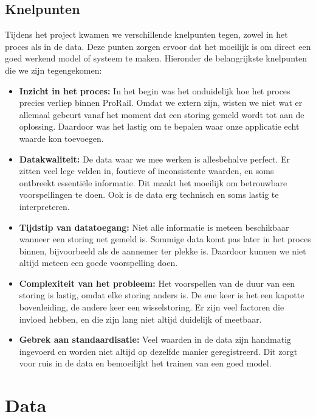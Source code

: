 \documentclass{article}
\begin{document}
\subsection{Knelpunten}
Tijdens het project kwamen we verschillende knelpunten tegen, zowel in het proces als in de data. Deze punten zorgen ervoor dat het moeilijk is om direct een goed werkend model of systeem te maken. Hieronder de belangrijkste knelpunten die we zijn tegengekomen:

\begin{itemize}
    \item \textbf{Inzicht in het proces:} In het begin was het onduidelijk hoe het proces precies verliep binnen ProRail. Omdat we extern zijn, wisten we niet wat er allemaal gebeurt vanaf het moment dat een storing gemeld wordt tot aan de oplossing. Daardoor was het lastig om te bepalen waar onze applicatie echt waarde kon toevoegen.

    \item \textbf{Datakwaliteit:} De data waar we mee werken is allesbehalve perfect. Er zitten veel lege velden in, foutieve of inconsistente waarden, en soms ontbreekt essentiële informatie. Dit maakt het moeilijk om betrouwbare voorspellingen te doen. Ook is de data erg technisch en soms lastig te interpreteren.

    \item \textbf{Tijdstip van datatoegang:} Niet alle informatie is meteen beschikbaar wanneer een storing net gemeld is. Sommige data komt pas later in het proces binnen, bijvoorbeeld als de aannemer ter plekke is. Daardoor kunnen we niet altijd meteen een goede voorspelling doen.

    \item \textbf{Complexiteit van het probleem:} Het voorspellen van de duur van een storing is lastig, omdat elke storing anders is. De ene keer is het een kapotte bovenleiding, de andere keer een wisselstoring. Er zijn veel factoren die invloed hebben, en die zijn lang niet altijd duidelijk of meetbaar.

    \item \textbf{Gebrek aan standaardisatie:} Veel waarden in de data zijn handmatig ingevoerd en worden niet altijd op dezelfde manier geregistreerd. Dit zorgt voor ruis in de data en bemoeilijkt het trainen van een goed model.
\end{itemize}

\newpage
\section{Data}
\end{document}
